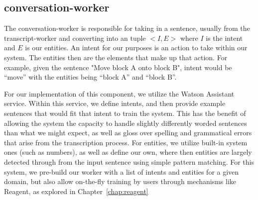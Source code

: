 \subsection{conversation-worker}

The conversation-worker is responsible for taking in a sentence, usually from the transcript-worker
and converting into an tuple $<I, E>$ where $I$ is the intent and $E$ is our entities. An intent for our
purposes is an action to take within our system. The entities then are the elements that make up that action.
For example, given the sentence "Move block A onto block B", intent would be ``move'' with the entities being
``block A'' and ``block B''.

For our implementation of this component, we utilize the Watson Assistant service. Within this service,
we define intents, and then provide example sentences that would fit that intent to train the system.
This has the benefit of allowing the system the capacity to handle slightly differently worded sentences
than what we might expect, as well as gloss over spelling and grammatical errors that arise from the
transcription process. For entities, we utilize built-in system ones (such as numbers), as well as define
our own, where then entities are largely detected through from the input sentence using simple pattern matching.
For this system, we pre-build our worker with a list of intents and entities for a given domain, but also
allow on-the-fly training by users through mechanisms like Reagent, as explored in Chapter~\ref{chap:reagent}